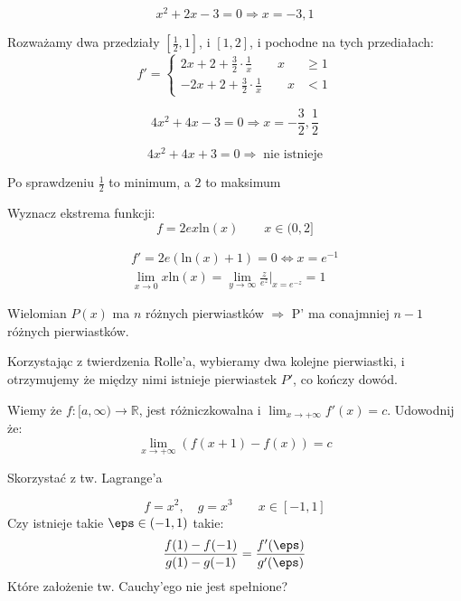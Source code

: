 \documentclass[11pt]{scrartcl}
\begin{document}
  \[
      x^2 + 2x - 3 = 0 \Rightarrow x = -3, 1
  \]
  
  Rozważamy dwa przedziały $\left [ \frac{1}{2}, 1 \right ]$, i $\left [ 1, 2 \right ]$, i pochodne na tych przediałach:
  \[
      f' = 
      \begin{cases}
        2x + 2 + \frac{3}{2} \cdot \frac{1}{x} \qquad x &\geq 1 \\
        -2x + 2 + \frac{3}{2} \cdot \frac{1}{x} \qquad x &< 1
      \end{cases}
  \]

  \[
      4x^2 + 4x -3 = 0 \Rightarrow x = -\frac{3}{2}, \frac{1}{2} 
  \]
  
  \[
      4x^2 + 4x + 3 = 0 \Rightarrow \; \text{nie istnieje} 
  \]
  
  Po sprawdzeniu $\frac{1}{2}$ to minimum, a $2$ to maksimum

  \begin{przykład}
      Wyznacz ekstrema funkcji:
      \[
        f = 2 e x \text{ln} \left ( x \right ) \qquad x \in (0, 2]
      \]
  \end{przykład}
  
  \begin{gather*}
      f' = 2e \left ( \text{ln} \left ( x \right ) + 1 \right ) = 0 \iff  x = {e}^{-1} \\
      \lim_{x \to 0} x \text{ln} \left ( x \right ) = \lim_{y \to \infty } \frac{z}{e^z} \rvert_{x = e^{-z}} = 1   
  \end{gather*}

  \begin{zadanie}
    Wielomian $P(x)$ ma $n$ różnych pierwiastków $\Rightarrow $ P' ma conajmniej $n-1$ różnych pierwiastków.
      
  \end{zadanie}
  
  Korzystając z twierdzenia Rolle'a, wybieramy dwa kolejne pierwiastki, i otrzymujemy że między nimi istnieje pierwiastek $P'$, co kończy dowód.

  \begin{zadanie}
    Wiemy że $f : [a, \infty ) \to \mathbb{R} $, jest różniczkowalna i $\lim_{x \to +\infty } f'(x) = c $. Udowodnij że:
    \[
        \lim_{x \to + \infty } \left ( f(x+1) - f(x) \right ) = c  
    \]
    
  \end{zadanie}
  
  Skorzystać z tw. Lagrange'a

  \begin{zadanie}
      \[
          f = x^2, \quad g = x^3 \qquad x \in \left [ -1, 1 \right ]
      \]
      Czy istnieje takie $\eps \in \left ( -1,1 \right )$ takie:
      \[
          \frac{f(1) - f(-1)}{g(1) - g(-1)} = \frac{f'(\eps)}{g'(\eps)}
      \]
     Które założenie tw. Cauchy'ego nie jest spełnione?
  \end{zadanie}
\end{document}
